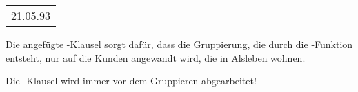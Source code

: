         \begin{center}
          \begin{small}
            \tablehead{}
            \begin{msoraclesql}
              \begin{supertabular}{l}
                21.05.93 \\
              \end{supertabular}
            \end{msoraclesql}
          \end{small}
        \end{center}
        Die angefügte \WHERE-Klausel sorgt dafür, dass die Gruppierung, die durch die -Funktion entsteht, nur auf die Kunden angewandt wird, die in Alsleben wohnen.

        \begin{merke}
          Die \WHERE-Klausel wird immer vor dem Gruppieren abgearbeitet!
        \end{merke}
